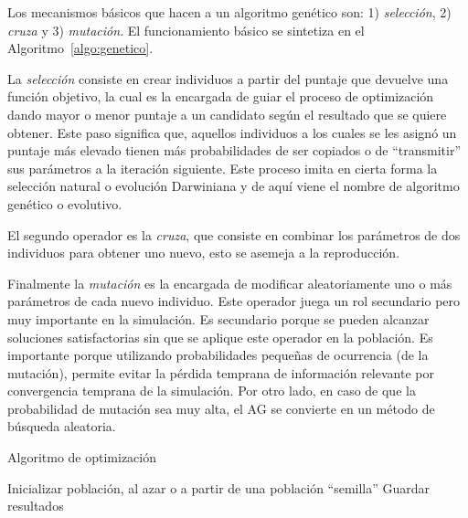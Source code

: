 %
Los mecanismos básicos que hacen a un algoritmo genético son: 1) \emph{selección}, 2)
\emph{cruza} y 3) \emph{mutación}.
%
El funcionamiento básico se sintetiza en el Algoritmo~\ref{algo:genetico}.

La \emph{selección} consiste en crear individuos a partir del puntaje que devuelve
una función objetivo, la cual es la encargada de guiar el proceso de
optimización dando mayor o menor puntaje a un candidato según el resultado que
se quiere obtener.
%
Este paso significa que, aquellos individuos a los cuales se les asignó un
puntaje más elevado tienen más probabilidades de ser copiados o de
``transmitir'' sus parámetros a la iteración siguiente.
%
Este proceso imita en cierta forma la selección natural o evolución Darwiniana y
de aquí viene el nombre de algoritmo genético o evolutivo.

El segundo operador es la \emph{cruza}, que consiste en combinar los parámetros
de dos individuos para obtener uno nuevo, esto se asemeja a la reproducción.

Finalmente la \emph{mutación} es la encargada de modificar aleatoriamente uno o más
parámetros de cada nuevo individuo.
%
Este operador juega un rol secundario pero muy importante en la simulación.
%
Es secundario porque se pueden alcanzar soluciones satisfactorias sin que se
aplique este operador en la población.
%
Es importante porque utilizando probabilidades pequeñas de ocurrencia (de la
mutación), permite evitar la pérdida temprana de información relevante por
convergencia temprana de la simulación.
%
Por otro lado, en caso de que la probabilidad de mutación sea muy alta, el AG se
convierte en un método de búsqueda aleatoria.

\begin{algorithm} \caption{Algoritmo de optimización}\label{algo:genetico}
  Inicializar población, al azar o a partir de una población ``semilla''\;
  {Guardar resultados\;}
\end{algorithm}

